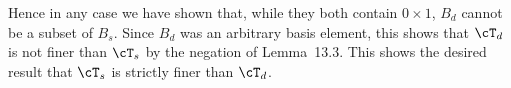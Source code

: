{{    Hence in any case we have shown that, while they both contain $0 \times 1$, $B_d$ cannot be a subset of $B_s$.
    Since $B_d$ was an arbitrary basis element, this shows that $\cT_d$ is not finer than $\cT_s$ by the negation of Lemma~13.3.
    This shows the desired result that $\cT_s$ is strictly finer than $\cT_d$.
  }
}

